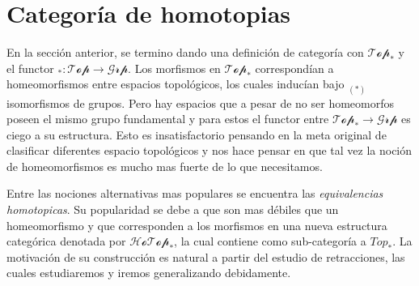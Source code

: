 \section{Categoría de homotopias}
En la sección anterior, se termino dando una definición de categoría con
\(\mathscr{Top}_*\) y el functor \(_{{*}} : \mathscr{Top} \to
\mathscr{Grp}\). Los morfismos en \(\mathscr{Top}_*\) correspondían a
homeomorfismos entre espacios topológicos, los cuales inducían bajo
\(_{(*)}\) isomorfismos de grupos. Pero hay espacios que a pesar de no
ser homeomorfos poseen el mismo grupo fundamental y para estos el
functor entre \(\mathscr{Top}_* \to \mathscr{Grp}\) es ciego a su
estructura. Esto es insatisfactorio pensando en la meta original de
clasificar diferentes espacio topológicos y nos hace pensar en que
tal vez la noción de homeomorfismos es mucho mas fuerte de lo que
necesitamos.

Entre las nociones alternativas mas populares se encuentra las
\emph{equivalencias homotopicas}. Su popularidad se debe a que son mas
débiles que un homeomorfismo y que corresponden a los morfismos en una
nueva estructura categórica denotada por \(\mathscr{HoTop}_*\), la cual
contiene como sub-categoría a \(Top_*\). La motivación de su
construcción es natural a partir del estudio de retracciones, las cuales
estudiaremos y iremos generalizando debidamente.

